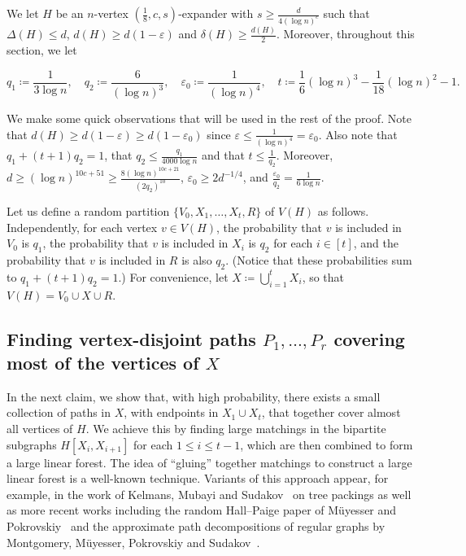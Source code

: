 \documentclass[10pt]{article}
\theoremstyle{plain}
\numberwithin{theorem}{section}
\theoremstyle{definition}
\theoremstyle{remark}
\newcommand{\eps}{\varepsilon}
\theoremstyle{plain}
\begin{document}
We let $H$ be an $n$-vertex $(\frac{1}{8}, c, s)$-expander with $s \ge \frac{d}{4 (\log n)^c}$ such that $\Delta(H) \le d$, $d(H) \ge d(1 - \eps)$ and $\delta(H) \ge \frac{d(H)}{2}$. Moreover, throughout this section, we let

\begin{equation*}
	q_1 \coloneqq \frac{1}{3\log n}, \quad 
	q_2 \coloneqq \frac{6}{(\log n)^3}, \quad 
	\eps_0 \coloneqq \frac{1}{(\log n)^4}, \quad
	t \coloneqq \frac{1}{6} (\log n)^3 - \frac{1}{18} (\log n)^2-1.
\end{equation*}

We make some quick observations that will be used in the rest of the proof. Note that $d(H)  \ge d(1 - \eps) \ge d(1 - \eps_0)$ since $\eps \le \frac{1}{(\log n)^4} = \eps_0 $.
Also note that $q_1 + (t+1)q_2 = 1$, that $q_2 \le \frac{q_1}{4000 \log n}$ and that $t \le \frac{1}{q_2}$. Moreover, $d \ge (\log n)^{10 c + 51} \ge \frac{8(\log n)^{10c +21}}{(2q_2)^{10}}$, $\eps_0 \ge 2d^{-1/4}$, and $\frac{\eps_0}{q_2} = \frac{1}{6\log n}$.


Let us define a random partition $\{V_0, X_1, \ldots, X_t, R\}$ of $V(H)$ as follows. 
Independently, for each vertex $v\in V(H)$, the probability that $v$ is included in $V_0$ is $q_1$, the probability that $v$ is included in $X_i$  is $q_2$ for each $i \in [t]$, and the probability that $v$ is included in $R$ is also $q_2$. (Notice that these probabilities sum to $q_1 + (t+1)q_2 = 1$.) For convenience, let $X \coloneqq \bigcup_{i = 1}^t X_i$, so that $V(H) = V_0 \cup X \cup R$. 

\subsection{Finding vertex-disjoint paths \texorpdfstring{$P_1, \ldots, P_r$}{P1, \ldots, Pr} covering most of the vertices of \texorpdfstring{$X$}{X}}
\label{subsec:finding a linear forest}

	In the next claim, we show that, with high probability, there exists a small collection of paths in $X$, with endpoints in $X_1\cup X_t$, that together cover almost all vertices of $H$. We achieve this by finding large matchings in the bipartite subgraphs $H[X_i,X_{i+1}]$ for each $1\le i\le t-1$, which are then combined to form a large linear forest.  The idea of ``gluing'' together matchings to construct a large linear forest is a well-known technique. Variants of this approach appear, for example, in the work of Kelmans, Mubayi and Sudakov~\cite{KelmansMubayiSudakov2001} on tree packings as well as more recent works including the random Hall--Paige paper of M{\"u}yesser and Pokrovskiy~\cite{MuyesserPokrovskiy2025RandomHallPaige} and the approximate path decompositions of regular graphs by Montgomery, M{\"u}yesser, Pokrovskiy and Sudakov~\cite{montgomery2024approximate}.
    
\end{document}
